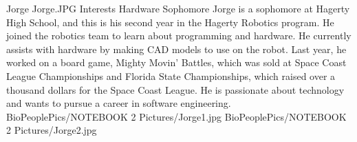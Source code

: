 \insertbio
{Jorge}
{Jorge.JPG}
{Interests}
{Hardware}
{Sophomore}
{
Jorge is a sophomore at Hagerty High School, and this is his second year in the Hagerty Robotics program. He joined the robotics team to learn about programming and hardware. He currently assists with hardware by making CAD models to use on the robot. Last year, he worked on a board game, Mighty Movin’ Battles, which was sold at Space Coast League Championships and Florida State Championships, which raised over a thousand dollars for the Space Coast League. He is passionate about technology and wants to pursue a career in software engineering.
}
{BioPeoplePics/NOTEBOOK 2 Pictures/Jorge1.jpg}
{BioPeoplePics/NOTEBOOK 2 Pictures/Jorge2.jpg}
